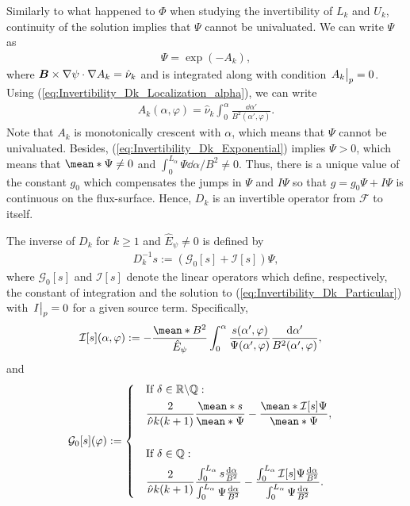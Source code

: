 Similarly to what happened to $\Phi$ when studying the invertibility of $L_k$ and $U_k$, continuity of the solution implies that $\Psi$ cannot be univaluated. We can write $\Psi$ as
%
\begin{align}
	\Psi = \exp(-A_k), 
	\label{eq:Invertibility_Dk_Exponential}
\end{align}
where $\vb*{B}\times \nabla\psi \cdot \nabla A_k = \hat{\nu}_k$ and is integrated along with condition $\eval{A_k}_{p}=0$. Using (\ref{eq:Invertibility_Dk_Localization_alpha}), we can write
%
\begin{align}
	A_k(\alpha,\varphi) = \hat{\nu}_k \int_{0}^{\alpha} \frac{\dd{\alpha'}}{ B^2(\alpha',\varphi)}.
\end{align}
Note that $A_k$ is monotonically crescent with $\alpha$, which means that $\Psi $ cannot be univaluated. Besides, (\ref{eq:Invertibility_Dk_Exponential}) implies $\Psi>0$, which means that $\mean*{\Psi}\ne 0 $ and $\int_{0}^{L_\alpha}\Psi   \dd{\alpha}/  B^2 \ne 0 $. Thus, there is a unique value of the constant $g_0$ which compensates the jumps in $\Psi$ and $I\Psi$ so that $g=g_0 \Psi + I \Psi$ is continuous on the flux-surface. Hence, $D_k$ is an invertible operator from $\mathcal{F}$ to itself. 


The inverse of $D_k$ for $k \ge 1$ and $\hat{E}_\psi \ne 0$ is defined by
%
\begin{align}
	D_k^{-1} s :=  ( \mathcal{G}_0[s] + \mathcal{I}[s] ) \Psi,
\end{align}
where $\mathcal{G}_0[s]$ and $\mathcal{I}[s]$ denote the linear operators which define, respectively, the constant of integration and the solution to (\ref{eq:Invertibility_Dk_Particular}) with $\eval{I}_{p}=0$ for a given source term. Specifically,
%
\begin{align}
	\mathcal{I}[s](\alpha,\varphi)
	& :=
	- \frac{\mean*{B^2}}{\hat{E}_\psi}
	\int_{0}^{\alpha}
	\frac{s(\alpha',\varphi)}{\Psi(\alpha',\varphi)}
	\frac{\dd{\alpha'}}{ B^2(\alpha',\varphi)}  ,
\end{align}
and
\begin{align}
	\mathcal{G}_0[s](\varphi)
	& :=
	\begin{dcases}
		& \text{If }\delta\in\mathbb{R}\backslash\mathbb{Q}:\\
		& \frac{2}{ \hat{\nu} k (k+1) } \frac{\mean*{s}}{\mean*{\Psi} }
		- 
		\frac{\mean*{\mathcal{I}[s] \Psi}}{\mean*{\Psi} },  
		\vspace{0.5cm} \\ 
		& \text{If }\delta\in\mathbb{Q}:\\
		& \frac{2}{\hat{\nu} k(k+1)} \dfrac{\int_{0}^{L_\alpha} s \frac{\dd{\alpha}}{ B^2 }}{\int_{0}^{L_\alpha} \Psi\frac{\dd{\alpha}}{ B^2 }}
		 -      
		\dfrac{\int_{0}^{L_\alpha}   \mathcal{I}[s] \Psi  \frac{\dd{\alpha}}{ B^2 }}{\int_{0}^{L_\alpha} \Psi\frac{\dd{\alpha}}{ B^2 }} .
	\end{dcases}  
\end{align}


